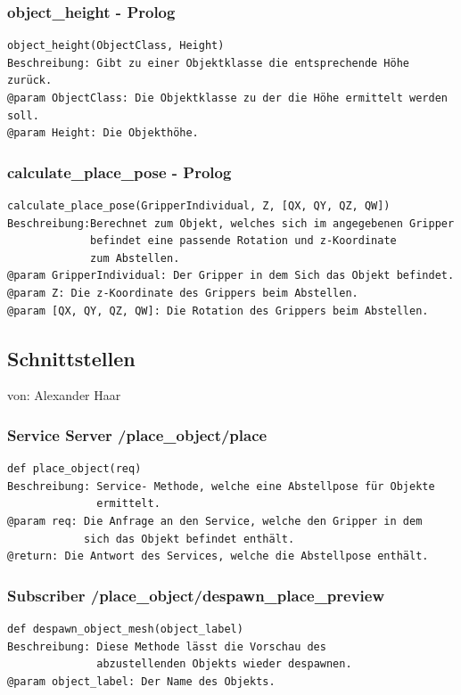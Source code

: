 \documentclass{suturo}
\makeatletter
\newcommand{\chapterauthor}[1]{%
  {\parindent0pt\vspace*{-27pt}%
  \linespread{0}\small\begin{flushright}von: #1\end{flushright}%
  \par\nobreak\vspace*{0pt}}
  \@afterheading%
}
\makeatother
\begin{document}
\subsubsection{object\_height - Prolog}
\begin{verbatim}
object_height(ObjectClass, Height)
Beschreibung: Gibt zu einer Objektklasse die entsprechende Höhe zurück.
@param ObjectClass: Die Objektklasse zu der die Höhe ermittelt werden soll.
@param Height: Die Objekthöhe.
\end{verbatim}

\subsubsection{calculate\_place\_pose - Prolog}
\begin{verbatim}
calculate_place_pose(GripperIndividual, Z, [QX, QY, QZ, QW])
Beschreibung:Berechnet zum Objekt, welches sich im angegebenen Gripper
             befindet eine passende Rotation und z-Koordinate 
             zum Abstellen.
@param GripperIndividual: Der Gripper in dem Sich das Objekt befindet.
@param Z: Die z-Koordinate des Grippers beim Abstellen.
@param [QX, QY, QZ, QW]: Die Rotation des Grippers beim Abstellen.
\end{verbatim}

\subsection{Schnittstellen}
\chapterauthor{Alexander Haar}

\subsubsection{Service Server /place\_object/place}
\begin{verbatim}
def place_object(req)
Beschreibung: Service- Methode, welche eine Abstellpose für Objekte 
              ermittelt.
@param req: Die Anfrage an den Service, welche den Gripper in dem 
            sich das Objekt befindet enthält.  
@return: Die Antwort des Services, welche die Abstellpose enthält.

\end{verbatim}

\subsubsection{Subscriber /place\_object/despawn\_place\_preview}
\begin{verbatim}
def despawn_object_mesh(object_label)
Beschreibung: Diese Methode lässt die Vorschau des 
              abzustellenden Objekts wieder despawnen.
@param object_label: Der Name des Objekts.

\end{verbatim}
\end{document}
